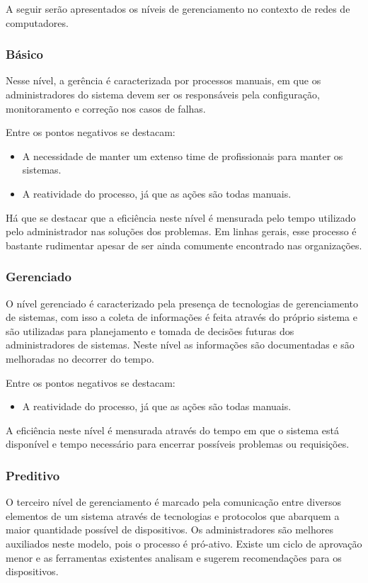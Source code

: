 \documentclass[11pt,twoside]{article}
\begin{document}
A seguir serão apresentados os níveis de gerenciamento no contexto de redes de computadores.

\subsubsection{Básico}
Nesse nível, a gerência é caracterizada por processos manuais, em que os administradores do sistema devem ser os responsáveis pela configuração, monitoramento e correção nos casos de falhas. 

Entre os pontos negativos se destacam:
\begin{itemize}
\item A necessidade de manter um extenso time de profissionais para manter os sistemas.
\item A reatividade do processo, já que as ações são todas manuais.
\end{itemize}

Há que se destacar que a eficiência neste nível é mensurada pelo tempo utilizado pelo administrador nas soluções dos problemas. Em linhas gerais, esse processo é bastante rudimentar apesar de ser ainda comumente encontrado nas organizações.

\subsubsection{Gerenciado}
O nível gerenciado é caracterizado pela presença de tecnologias de gerenciamento de sistemas, com isso a coleta de informações é feita através do próprio sistema e são utilizadas para planejamento e tomada de decisões futuras dos administradores de sistemas. Neste nível as informações são documentadas e são melhoradas no decorrer do tempo.

Entre os pontos negativos se destacam:
\begin{itemize}
\item A reatividade do processo, já que as ações são todas manuais.
\end{itemize}

A eficiência neste nível é mensurada através do tempo em que o sistema está disponível e tempo necessário para encerrar possíveis problemas ou requisições.

\subsubsection{Preditivo}
O terceiro nível de gerenciamento é marcado pela comunicação entre diversos elementos de um sistema através de tecnologias e protocolos que abarquem a maior quantidade possível de dispositivos. Os administradores são melhores auxiliados neste modelo, pois o processo é pró-ativo. Existe um ciclo de aprovação menor e as ferramentas existentes analisam e sugerem recomendações para os dispositivos.
\end{document}
